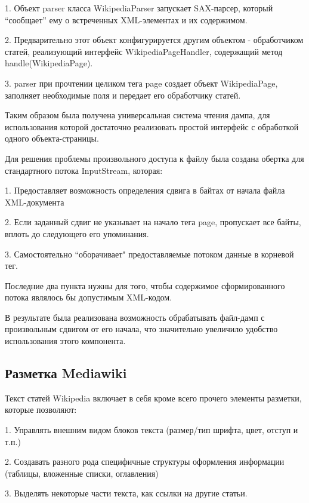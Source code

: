 1. Объект parser класса WikipediaParser запускает SAX-парсер, который “сообщает” 
ему о встреченных XML-элементах и их содержимом.

2. Предварительно этот объект конфигурируется другим объектом - обработчиком статей,
 реализующий интерфейс WikipediaPageHandler, содержащий метод handle(WikipediaPage).

3. parser при прочтении целиком тега page создает объект WikipediaPage, заполняет 
необходимые поля и передает его обработчику статей.


Таким образом была получена универсальная система чтения дампа, для использования которой 
достаточно реализовать простой интерфейс с обработкой одного объекта-страницы.

Для решения проблемы произвольного доступа к файлу была создана обертка для стандартного потока InputStream, которая:

1. Предоставляет возможность определения сдвига в байтах от начала файла XML-документа

2. Если заданный сдвиг не указывает на начало тега page, пропускает все байты, 
вплоть до следующего его упоминания.

3. Самостоятельно “оборачивает" предоставляемые потоком данные в корневой тег.

Последние два пункта нужны для того, чтобы содержимое сформированного потока являлось бы допустимым XML-кодом.

В результате была реализована возможность обрабатывать файл-дамп с произвольным
сдвигом от его начала, что значительно увеличило удобство использования этого компонента.  

\subsection{Разметка Mediawiki}

Текст статей Wikipedia включает в себя кроме всего прочего элементы разметки\cite{wikimarkup}, которые позволяют:

1. Управлять внешним видом блоков текста (размер/тип шрифта, цвет, отступ и т.п.)

2. Создавать разного рода специфичные структуры оформления информации (таблицы, вложенные списки, оглавления)

3. Выделять некоторые части текста, как ссылки на другие статьи.

